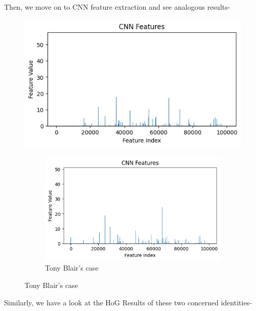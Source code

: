\documentclass[a4paper]{article}
\theoremstyle{plain}
\theoremstyle{definition}
\begin{document}
 Then, we move on to CNN feature extraction and see analogous results-
 \begin{figure}[H]
     \centering
     \includegraphics[width=1\linewidth]{WhatsApp Image 2024-04-21 at 14.23.53_f8ac10e0.jpg}
     \caption{George Bush's case }
\begin{figure}[H]
         \centering
         \includegraphics[width=1\linewidth]{WhatsApp Image 2024-04-21 at 14.24.04_a447d26f.jpg}
         \caption{Tony Blair's case}
         \label{fig:enter-label}
     \end{figure}
          \label{fig:enter-label}
 \end{figure}
 Similarly, we have a look at the HoG Results of these two concerned identities-
\end{document}
